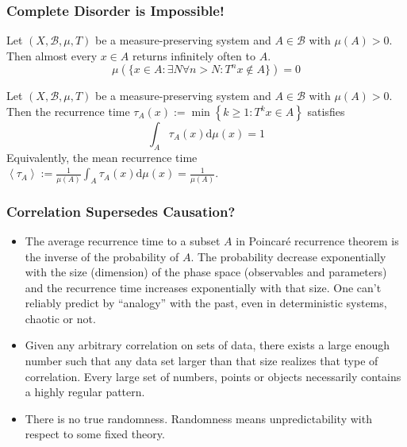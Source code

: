 \documentclass[UTF8,aspectratio=43,11pt,colorlinks,compress,openany]{beamer}%
\begin{document}
\begin{frame}\frametitle{Complete Disorder is Impossible!}
	\begin{theorem}
		Let $(X,{\mathcal{B}},\mu,T)$ be a measure-preserving system and $A\in\mathcal{B}$ with $\mu(A) > 0$. Then almost every $x\in A$ returns infinitely often to $A$.
		\[
		\mu\left(\{x\in A: \exists N\forall n>N: T^n x\notin A\}\right)=0
		\]
	\end{theorem}
	\begin{lemma}
		Let $(X,{\mathcal{B}},\mu,T)$ be a measure-preserving system and $A\in\mathcal{B}$ with $\mu(A) > 0$. Then the recurrence time $\tau_A(x):=\min\left\{k\geq 1: T^k x\in A\right\}$ satisfies
		\[\int_A\!\tau_A(x)\mathrm{d}\mu(x)=1\]
		Equivalently, the mean recurrence time $\left\langle \tau_A\right\rangle:=\frac{1}{\mu(A)}\int_A\!\tau_A(x)\mathrm{d}\mu(x)=\frac{1}{\mu(A)}$.
	\end{lemma}
\end{frame}

\begin{frame}\frametitle{Correlation Supersedes Causation?}
	\begin{itemize}
		\item The average recurrence time to a subset $A$ in Poincar\'e recurrence theorem is the inverse of the probability of $A$. The probability decrease exponentially with the size (dimension) of the phase space (observables and parameters) and the recurrence time increases exponentially with that size. One can't reliably predict by ``analogy'' with the past, even in deterministic systems, chaotic or not.
		\item Given any arbitrary correlation on sets of data, there exists a large enough number such that any data set larger than that size realizes that type of correlation. Every large set of numbers, points or objects necessarily contains a highly regular pattern.
		\item There is no true randomness. Randomness means unpredictability with respect to some fixed theory.
	\end{itemize}
\end{frame}
\end{document}
